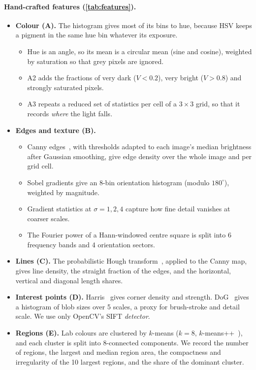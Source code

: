 \documentclass[10pt,twocolumn,a4paper]{article}
\begin{document}
\paragraph{Hand-crafted features (\cref{tab:features}).}
\begin{itemize}
\item \textbf{Colour (A).} The histogram gives most of its bins to hue, because HSV keeps a pigment in the same hue bin whatever its exposure.
\begin{itemize}
\item Hue is an angle, so its mean is a circular mean (sine and cosine), weighted by saturation so that grey pixels are ignored.
\item A2 adds the fractions of very dark ($V{<}0.2$), very bright ($V{>}0.8$) and strongly saturated pixels.
\item A3 repeats a reduced set of statistics per cell of a $3{\times}3$ grid, so that it records \emph{where} the light falls.
\end{itemize}
\item \textbf{Edges and texture (B).}
\begin{itemize}
\item Canny edges~\cite{canny1986computational}, with thresholds adapted to each image's median brightness after Gaussian smoothing, give edge density over the whole image and per grid cell.
\item Sobel gradients give an 8-bin orientation histogram (modulo $180^\circ$), weighted by magnitude.
\item Gradient statistics at $\sigma{=}1,2,4$ capture how fine detail vanishes at coarser scales.
\item The Fourier power of a Hann-windowed centre square is split into 6 frequency bands and 4 orientation sectors.
\end{itemize}
\item \textbf{Lines (C).} The probabilistic Hough transform~\cite{duda1972use,matas2000robust}, applied to the Canny map, gives line density, the straight fraction of the edges, and the horizontal, vertical and diagonal length shares.
\item \textbf{Interest points (D).} Harris~\cite{harris1988combined} gives corner density and strength. DoG~\cite{lowe2004distinctive} gives a histogram of blob sizes over 5 scales, a proxy for brush-stroke and detail scale. We use only OpenCV's SIFT \emph{detector}.
\item \textbf{Regions (E).} Lab colours are clustered by $k$-means ($k{=}8$, $k$-means++~\cite{arthur2007kmeans}), and each cluster is split into 8-connected components. We record the number of regions, the largest and median region area, the compactness and irregularity of the 10 largest regions, and the share of the dominant cluster.
\end{itemize}
\end{document}
